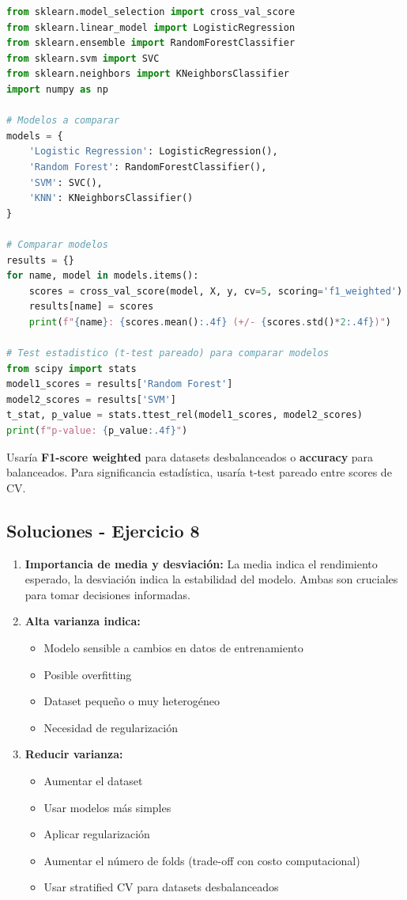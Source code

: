\documentclass[12pt]{article}
\begin{document}
\begin{lstlisting}[language=Python]
from sklearn.model_selection import cross_val_score
from sklearn.linear_model import LogisticRegression
from sklearn.ensemble import RandomForestClassifier
from sklearn.svm import SVC
from sklearn.neighbors import KNeighborsClassifier
import numpy as np

# Modelos a comparar
models = {
    'Logistic Regression': LogisticRegression(),
    'Random Forest': RandomForestClassifier(),
    'SVM': SVC(),
    'KNN': KNeighborsClassifier()
}

# Comparar modelos
results = {}
for name, model in models.items():
    scores = cross_val_score(model, X, y, cv=5, scoring='f1_weighted')
    results[name] = scores
    print(f"{name}: {scores.mean():.4f} (+/- {scores.std()*2:.4f})")

# Test estadistico (t-test pareado) para comparar modelos
from scipy import stats
model1_scores = results['Random Forest']
model2_scores = results['SVM'] 
t_stat, p_value = stats.ttest_rel(model1_scores, model2_scores)
print(f"p-value: {p_value:.4f}")
\end{lstlisting}

Usaría \textbf{F1-score weighted} para datasets desbalanceados o \textbf{accuracy} para balanceados. Para significancia estadística, usaría t-test pareado entre scores de CV.

\subsection{Soluciones - Ejercicio 8}

\begin{enumerate}
    \item \textbf{Importancia de media y desviación:} La media indica el rendimiento esperado, la desviación indica la estabilidad del modelo. Ambas son cruciales para tomar decisiones informadas.
    
    \item \textbf{Alta varianza indica:}
    \begin{itemize}
        \item Modelo sensible a cambios en datos de entrenamiento
        \item Posible overfitting
        \item Dataset pequeño o muy heterogéneo
        \item Necesidad de regularización
    \end{itemize}
    
    \item \textbf{Reducir varianza:}
    \begin{itemize}
        \item Aumentar el dataset
        \item Usar modelos más simples
        \item Aplicar regularización
        \item Aumentar el número de folds (trade-off con costo computacional)
        \item Usar stratified CV para datasets desbalanceados
    \end{itemize}
\end{enumerate}
\end{document}
